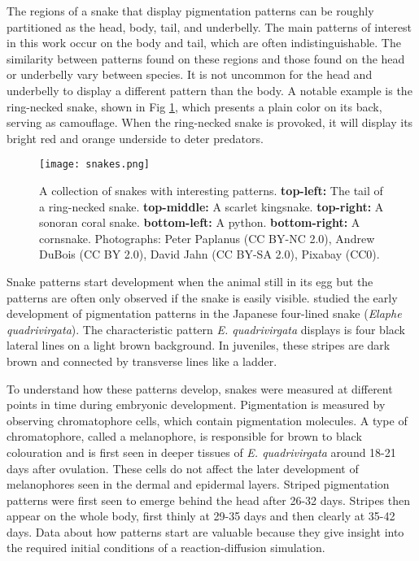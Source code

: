 The regions of a snake that display pigmentation patterns can be roughly partitioned as the head, body, tail, and underbelly. The main patterns of interest in this work occur on the body and tail, which are often indistinguishable. The similarity between patterns found on these regions and those found on the head or underbelly vary between species. It is not uncommon for the head and underbelly to display a different pattern than the body. A notable example is the ring-necked snake, shown in Fig \ref{fig:realSnakePatterns}, which presents a plain color on its back, serving as camouflage. When the ring-necked snake is provoked, it will display its bright red and orange underside to deter predators.

\begin{figure}[hb]
	\centering
	\texttt{[image: snakes.png]}
	\caption{A collection of snakes with interesting patterns. \textbf{top-left:} The tail of a ring-necked snake. \textbf{top-middle:} A scarlet kingsnake. \textbf{top-right:} A sonoran coral snake. \textbf{bottom-left:} A python. \textbf{bottom-right:} A cornsnake. \textcolor{citation-gray}{Photographs: Peter Paplanus (CC BY-NC 2.0), Andrew DuBois (CC BY 2.0), David Jahn (CC BY-SA 2.0), Pixabay (CC0).}}
	\label{fig:realSnakePatterns}
\end{figure}

Snake patterns start development when the animal still in its egg but the patterns are often only observed if the snake is easily visible. \citet{murakami2018} studied the early development of pigmentation patterns in the Japanese four-lined snake (\textit{Elaphe quadrivirgata}). The characteristic pattern \textit{E. quadrivirgata} displays is four black lateral lines on a light brown background. In juveniles, these stripes are dark brown and connected by transverse lines like a ladder. 
 
To understand how these patterns develop, snakes were measured at different points in time during embryonic development. Pigmentation is measured by observing chromatophore cells, which contain pigmentation molecules. A type of chromatophore, called a melanophore, is responsible for brown to black colouration and is first seen in deeper tissues of \textit{E. quadrivirgata} around 18-21 days after ovulation. These cells do not affect the later development of melanophores seen in the dermal and epidermal layers. Striped pigmentation patterns were first seen to emerge behind the head after 26-32 days. Stripes then appear on the whole body, first thinly at 29-35 days and then clearly at 35-42 days. Data about how patterns start are valuable because they give insight into the required initial conditions of a reaction-diffusion simulation.

